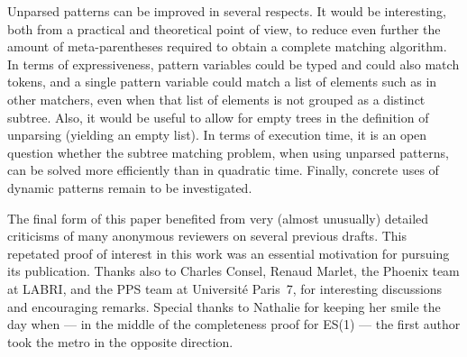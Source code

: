 \documentclass{sigplanconf}
\begin{document}
Unparsed patterns can be improved in several respects. It would be
interesting, both from a practical and theoretical point of view, to
reduce even further the amount of meta-parentheses required to obtain
a complete matching algorithm. In terms of expressiveness, pattern
variables could be typed and could also match tokens, and a single
pattern variable could match a list of elements such as in other
matchers, even when that list of elements is not grouped as a distinct
subtree. Also, it would be useful to allow for empty trees in the
definition of unparsing (yielding an empty list). In terms of
execution time, it is an open question whether the subtree matching
problem, when using unparsed patterns, can be solved more efficiently
than in quadratic time. Finally, concrete uses of dynamic patterns
remain to be investigated.


\acks The final form of this paper benefited from very (almost
unusually) detailed criticisms of many anonymous reviewers on several
previous drafts. This repetated proof of interest in this work was an
essential motivation for pursuing its publication.
Thanks also to Charles Consel, Renaud Marlet, the Phoenix team at
LABRI, and the PPS team at Universit\'{e} Paris~7, for interesting
discussions and encouraging remarks.
Special thanks to Nathalie for keeping her smile the day when --- in
the middle of the completeness proof for ES(1) --- the first author
took the metro in the opposite direction.
\end{document}
